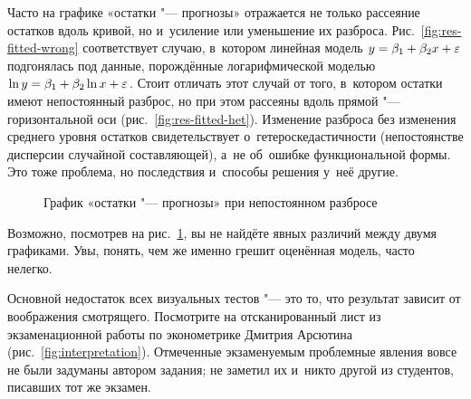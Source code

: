 \documentclass[final,pdftex]{../../template/epsilonj}
\begin{document}
Часто на графике «остатки "--- прогнозы» отражается не только рассеяние остатков вдоль кривой, но и~усиление или уменьшение их разброса. Рис.~\ref{fig:res-fitted-wrong} соответствует случаю, в~котором линейная модель $y = \beta_1 + \beta_2 x + \varepsilon$ подгонялась под данные, порождённые логарифмической моделью $\ln y = \beta_1 + \beta_2 \ln x + \varepsilon$. Стоит отличать этот случай от того, в~котором остатки имеют непостоянный разброс, но при этом рассеяны вдоль прямой "--- горизонтальной оси (рис.~\ref{fig:res-fitted-het}). Изменение разброса без изменения среднего уровня остатков свидетельствует о~гетероскедастичности (непостоянстве дисперсии случайной составляющей), а~не об~ошибке функциональной формы. Это тоже проблема, но последствия и~способы решения у~неё другие.

\begin{figure}[htbp]
	\centering
	 \quad
	\caption{График «остатки "--- прогнозы» при непостоянном разбросе}\label{fig:wrong}
\end{figure}

Возможно, посмотрев на рис.~\ref{fig:wrong}, вы не найдёте явных различий между двумя графиками. Увы, понять, чем же именно грешит оценённая модель, часто нелегко.

Основной недостаток всех визуальных тестов "--- это то, что результат зависит от воображения смотрящего. Посмотрите на отсканированный лист из экзаменационной работы по эконометрике Дмитрия Арсютина (рис.~\ref{fig:interpretation}). Отмеченные экзаменуемым проблемные явления вовсе не были задуманы автором задания; не заметил их и~никто другой из студентов, писавших тот же экзамен.
\end{document}
